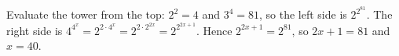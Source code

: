 Evaluate the tower from the top: $2^2=4$ and $3^4=81$, so the left side is $2^{2^{81}}$. The right side is $4^{4^x}=2^{2\cdot4^x}=2^{2\cdot2^{2x}}=2^{2^{2x+1}}$. Hence $2^{2x+1}=2^{81}$, so $2x+1=81$ and $x=\boxed{40}$.

